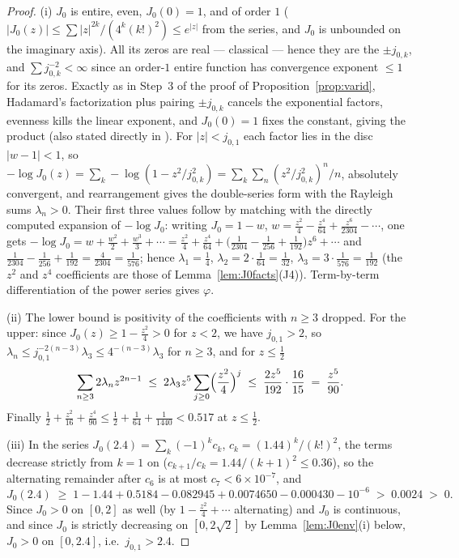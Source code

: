 \begin{proof}
(i) $J_0$ is entire, even, $J_0(0)=1$, and of order $1$
($|J_0(z)|\le\sum|z|^{2k}/(4^k(k!)^2)\le e^{|z|}$ from the series,
and $J_0$ is unbounded on the imaginary axis). All its zeros are real
--- classical \cite[Ch.~XV]{Wat44} --- hence they are the
$\pm j_{0,k}$, and $\sum j_{0,k}^{-2}<\infty$ since an order-$1$
entire function has convergence exponent $\le1$ for its zeros. Exactly
as in Step~3 of the proof of Proposition~\ref{prop:varid}, Hadamard's
factorization plus pairing $\pm j_{0,k}$ cancels the exponential
factors, evenness kills the linear exponent, and $J_0(0)=1$ fixes the
constant, giving the product (also stated directly in
\cite[Ch.~XV]{Wat44}). For $|z|<j_{0,1}$ each factor lies in the disc
$|w-1|<1$, so
$-\log J_0(z)=\sum_k-\log(1-z^2/j_{0,k}^2)
=\sum_k\sum_n(z^2/j_{0,k}^2)^n/n$, absolutely convergent, and
rearrangement gives the double-series form with the Rayleigh sums
$\lambda_n>0$. Their first three values follow by matching with the
directly computed expansion of $-\log J_0$: writing $J_0=1-w$,
$w=\tfrac{z^2}4-\tfrac{z^4}{64}+\tfrac{z^6}{2304}-\cdots$, one gets
$-\log J_0=w+\tfrac{w^2}2+\tfrac{w^3}3+\cdots
=\tfrac{z^2}4+\tfrac{z^4}{64}+\bigl(\tfrac1{2304}-\tfrac1{256}
+\tfrac1{192}\bigr)z^6+\cdots$ and
$\tfrac1{2304}-\tfrac1{256}+\tfrac1{192}=\tfrac{4}{2304}
=\tfrac1{576}$; hence $\lambda_1=\tfrac14$,
$\lambda_2=2\cdot\tfrac1{64}=\tfrac1{32}$,
$\lambda_3=3\cdot\tfrac1{576}=\tfrac1{192}$ (the $z^2$ and $z^4$
coefficients are those of Lemma~\ref{lem:J0facts}(J4)).
Term-by-term differentiation of the power series gives $\varphi$.

(ii) The lower bound is positivity of the coefficients with $n\ge3$
dropped. For the upper: since $J_0(z)\ge1-\tfrac{z^2}4>0$ for $z<2$,
we have $j_{0,1}>2$, so $\lambda_n\le j_{0,1}^{-2(n-3)}\lambda_3
\le4^{-(n-3)}\lambda_3$ for $n\ge3$, and for $z\le\tfrac12$
\[
\sum_{n\ge3}2\lambda_nz^{2n-1}
\;\le\;2\lambda_3z^5\sum_{j\ge0}\Bigl(\frac{z^2}4\Bigr)^{j}
\;\le\;\frac{2z^5}{192}\cdot\frac{16}{15}\;=\;\frac{z^5}{90}.
\]
Finally $\tfrac12+\tfrac{z^2}{16}+\tfrac{z^4}{90}
\le\tfrac12+\tfrac1{64}+\tfrac1{1440}<0.517$ at $z\le\tfrac12$.

(iii) In the series $J_0(2.4)=\sum_k(-1)^kc_k$,
$c_k=(1.44)^k/(k!)^2$, the terms decrease strictly from $k=1$ on
($c_{k+1}/c_k=1.44/(k+1)^2\le0.36$), so the alternating remainder
after $c_6$ is at most $c_7<6\times10^{-7}$, and
\[
J_0(2.4)\;\ge\;1-1.44+0.5184-0.082945+0.0074650-0.000430-10^{-6}
\;>\;0.0024\;>\;0 .
\]
Since $J_0>0$ on $[0,2]$ as well (by $1-\tfrac{z^2}4+\cdots$
alternating) and $J_0$ is continuous, and since $J_0$ is strictly
decreasing on $[0,2\sqrt2]$ by Lemma~\ref{lem:J0env}(i) below, $J_0>0$
on $[0,2.4]$, i.e.\ $j_{0,1}>2.4$.
\end{proof}

